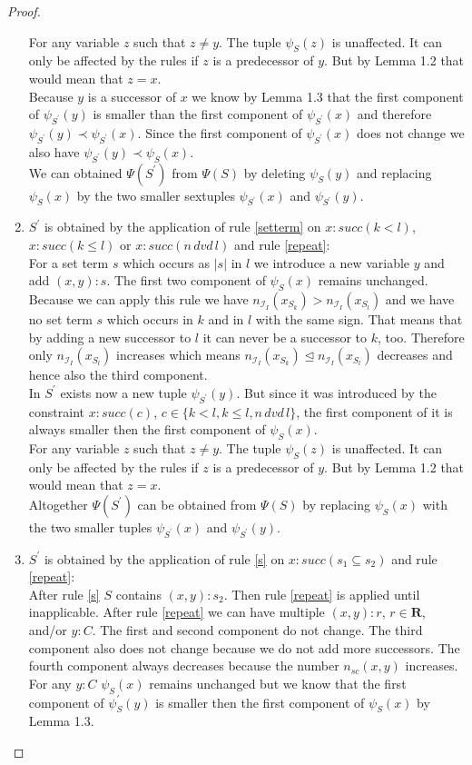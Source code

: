 \documentclass[a4paper,11pt]{scrartcl}
\theoremstyle{break}
\theoremstyle{definition}
\begin{document}
\begin{proof}
\begin{enumerate}
For any variable $z$ such that $z\neq y$. The tuple $\psi_S(z)$ is unaffected. It can only be affected by the rules if $z$ is a predecessor of $y$. But by Lemma 1.2 that would mean that $z=x$.\\
Because $y$ is a successor of $x$ we know by Lemma 1.3 that the first component of $\psi_{S^\prime}(y)$ is smaller than the first component of $\psi_{S^\prime}(x)$ and therefore $\psi_{S^\prime}(y)\prec\psi_{S^\prime}(x)$. Since the first component of $\psi_{S^\prime}(x)$ does not change we also have $\psi_{S^\prime}(y)\prec\psi_{S}(x)$.\\
We can obtained $\Psi(S^\prime)$ from $\Psi(S)$ by deleting $\psi_S(y)$ and replacing $\psi_S(x)$ by the two smaller sextuples $\psi_{S^\prime}(x)$ and $\psi_{S^\prime}(y)$.
\item $S^\prime$ is obtained by the application of rule \ref{setterm} on $x:succ(k<l)$, $x:succ(k\leq l)$ or $x:succ(n\,dvd\,l)$ and rule \ref{repeat}:\\ 
For a set term $s$ which occurs as $|s|$ in $l$ we introduce a new variable $y$ and add $(x,y):s$. The first two component of $\psi_S(x)$ remains unchanged. Because we can apply this rule we have $n_{\mathcal{I}_I}(x_{S_k})>n_{\mathcal{I}_I}(x_{S_l})$ and we have no set term $s$ which occurs in $k$ and in $l$ with the same sign. That means that by adding a new successor to $l$ it can never be a successor to $k$, too. Therefore only $n_{\mathcal{I}_I}(x_{S_l})$ increases which means $n_{\mathcal{I}_I}(x_{S_k})\unlhd n_{\mathcal{I}_I}(x_{S_l})$ decreases and hence also the third component.\\
In $S^\prime$ exists now a new tuple $\psi_{S^\prime}(y)$. But since it was introduced by the constraint $x:succ(c)$, $c\in\{k<l,k\leq l,n\,dvd\,l\}$, the first component of it is always smaller then the first component of $\psi_S(x)$.\\
For any variable $z$ such that $z\neq y$. The tuple $\psi_S(z)$ is unaffected. It can only be affected by the rules if $z$ is a predecessor of $y$. But by Lemma 1.2 that would mean that $z=x$.\\
Altogether $\Psi(S^\prime)$ can be obtained from $\Psi(S)$ by replacing $\psi_S(x)$ with the two smaller tuples $\psi_{S^\prime}(x)$ and $\psi_{S^\prime}(y)$.
\item $S^\prime$ is obtained by the application of rule \ref{s} on $x:succ(s_1\subseteq s_2)$ and rule \ref{repeat}:\\ 
After rule \ref{s} $S$ contains $(x,y):s_2$. Then rule \ref{repeat} is applied until inapplicable. After rule \ref{repeat} we can have multiple $(x,y):r$, $r\in\mathbf{R}$, and/or $y:C$. The first and second component do not change. The third component also does not change because we do not add more successors. The fourth component always decreases because the number $n_{sc}(x,y)$ increases. For any $y:C$ $\psi_S(x)$ remains unchanged but we know that the first component of $\psi_S^\prime(y)$ is smaller then the first component of $\psi_S(x)$ by Lemma 1.3.\\

\end{enumerate}
\end{proof}
\end{document}
